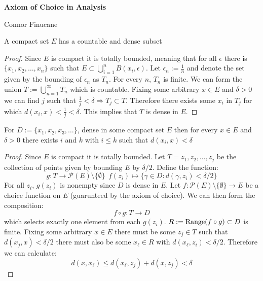 \documentclass[12pt,leqno]{amsart}
\begin{document}
\centerline{\bf Axiom of Choice in Analysis}

\centerline{Connor Finucane}

\bigskip
\bigskip

 A compact set $E$ has a countable and dense subset
\begin{proof}
Since $E$ is compact it is totally bounded, meaning that for all $\epsilon$ there is $\{x_1, x_2, \dots, x_n\}$ such that $E \subset \bigcup_{i=1}^n B(x_i, \epsilon)$.  Let $\epsilon_n := \frac{1}{n}$ and denote the set given by the bounding of $\epsilon_n$ as $T_n$.  For every $n$, $T_n$ is finite.  We can form the union $T := \bigcup_{n=1}^\infty T_n$ which is countable.  Fixing some arbitrary $x \in E$ and $\delta > 0$ we can find $j$ such that $\frac{1}{j} < \delta \Rightarrow T_j \subset T$.  Therefore there exists some $x_i$ in $T_j$ for which $d(x_i, x) < \frac{1}{j} < \delta$.  This implies that $T$ is dense in $E$.    
\end{proof}

 For $D:= \{x_1, x_2, x_3, \dots \}$, dense in some compact set $E$ then for every $x \in E$ and $\delta > 0$ there exists $i$ and $k$ with $i \leq k$ such that $d(x_i, x) <\delta$
\begin{proof}
Since $E$ is compact it is totally bounded.  Let $T = {z_1, z_2, \dots, z_j}$ be the collection of points given by bounding $E$ by $\delta /2$.  Define the function:
 $$ g: T \to \mathcal{P}(E) \setminus \{\emptyset\} \ \ f(z_i) \mapsto \{\gamma \in D : d(\gamma, z_i) <\delta/2 \}$$
For all $z_i$, $g(z_i)$ is nonempty since $D$ is dense in $E$.  Let $f : \mathcal{P}(E)\setminus \{ \emptyset \} \to E$ be a choice function on $E$ (guarunteed by the axiom of choice).  We can then form the composition: 
$$f\circ g: T \to D$$
which selects exactly one element from each $g(z_i)$.  $R := {\rm Range} (f\circ g) \subset D$ is finite.  Fixing some arbitrary $x \in E$ there must be some $z_j \in T$ such that $d(x_j, x) < \delta/2$ there must also be some $x_\ell \in R$ with $d(x_\ell, z_i) < \delta/2$.  Therefore we can calculate:
 $$d(x, x_\ell) \leq d(x_\ell, z_j) + d(x, z_j) < \delta$$

\end{proof}
\end{document}

